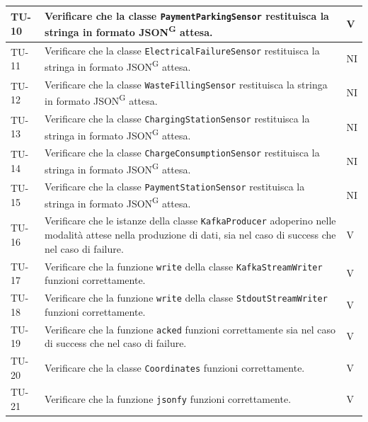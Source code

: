 \documentclass[8pt]{article}
\newcommand{\glossterm}[1]{#1\textsuperscript{G}} %
\begin{document}
\begin{longtable}{|>{\centering}p{2cm}|>{\RaggedRight}m{12cm}|>{\centering\arraybackslash}p{2cm}|}
    TU-10 & Verificare che la classe \verb|PaymentParkingSensor| restituisca la stringa in formato \glossterm{JSON} attesa. & V \\
    \hline

    TU-11 & Verificare che la classe \verb|ElectricalFailureSensor| restituisca la stringa in formato \glossterm{JSON} attesa. & NI \\
    \hline
    
    TU-12 & Verificare che la classe \verb|WasteFillingSensor| restituisca la stringa in formato \glossterm{JSON} attesa. & NI \\
    \hline

    TU-13 & Verificare che la classe \verb|ChargingStationSensor| restituisca la stringa in formato \glossterm{JSON} attesa. & NI \\
    \hline

    TU-14 & Verificare che la classe \verb|ChargeConsumptionSensor| restituisca la stringa in formato \glossterm{JSON} attesa. & NI \\
    \hline

    TU-15 & Verificare che la classe \verb|PaymentStationSensor| restituisca la stringa in formato \glossterm{JSON} attesa. & NI \\
    \hline
    
    TU-16 & Verificare che le istanze della classe \verb|KafkaProducer| adoperino nelle modalità attese nella produzione di dati, sia nel caso di success che nel caso di failure. & V \\
    \hline

    TU-17 & Verificare che la funzione \verb|write| della classe \verb|KafkaStreamWriter| funzioni correttamente. & V \\
    \hline

    TU-18 & Verificare che la funzione \verb|write| della classe
    \verb|StdoutStreamWriter| funzioni correttamente. & V \\
    \hline

    TU-19 & Verificare che la funzione \verb|acked| funzioni correttamente sia nel caso di success che nel caso di failure. & V \\
    \hline

    TU-20 & Verificare che la classe \verb|Coordinates| funzioni correttamente. & V \\
    \hline

    TU-21 & Verificare che la funzione \verb|jsonfy| funzioni correttamente. & V \\
    \hline

\end{longtable}
\clearpage
\end{document}
